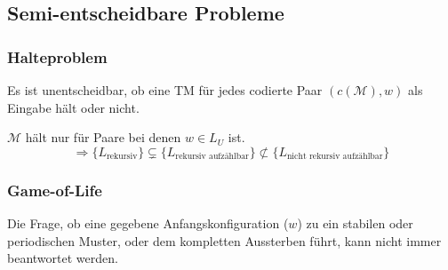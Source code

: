 
\subsection{Semi-entscheidbare Probleme}
\subsubsection{Halteproblem}
\begin{satz}
	Es ist unentscheidbar, ob eine TM für jedes codierte Paar $(c(\mathcal{M}), w)$ als Eingabe hält oder nicht.
\end{satz}
$\mathcal{M}$ hält nur für Paare bei denen $w \in L_U$ ist.
% 
\begin{equation*}
	\Rightarrow \{L_{\mbox{rekursiv}}\} \subsetneq \{L_{\mbox{rekursiv aufzählbar}}\} \not\subset \{L_{\mbox{nicht rekursiv aufzählbar}}\}
\end{equation*}	

\subsubsection{Game-of-Life}
Die Frage, ob eine gegebene Anfangskonfiguration ($w$) zu ein stabilen oder periodischen Muster, oder dem kompletten Aussterben führt, kann nicht immer beantwortet werden.

